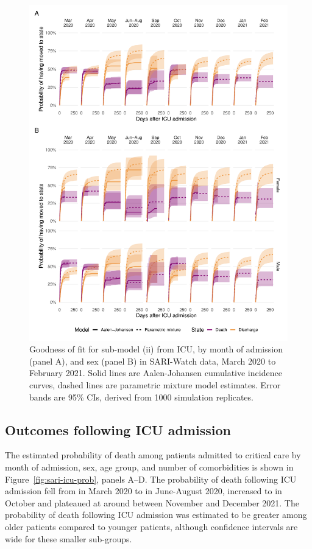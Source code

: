 \begin{figure}[htbp!]
    \centering
    \includegraphics[width=\textwidth]{sari_gof_icu.pdf}
    \caption[Goodness of fit for from ICU sub-model in SARI-Watch data, March 2020 to February 2021]{Goodness of fit for sub-model (ii) from ICU, by month of admission (panel A), and sex (panel B) in SARI-Watch data, March 2020 to February 2021. Solid lines are Aalen-Johansen cumulative incidence curves, dashed lines are parametric mixture model estimates. Error bands are 95\% CIs, derived from 1000 simulation replicates.}\label{fig:sari-gof-icu}
\end{figure}

\subsection{Outcomes following ICU admission}\label{appendix:sari-icu}

The estimated probability of death among patients admitted to critical care by month of admission, sex, age group, and number of comorbidities is shown in Figure~\ref{fig:sari-icu-prob}, panels A--D. The probability of death following ICU admission fell from  in March 2020 to  in June-August 2020, increased to  in October and plateaued at around  between November and December 2021. The probability of death following ICU admission was estimated to be greater among older patients compared to younger patients, although confidence intervals are wide for these smaller sub-groups.


